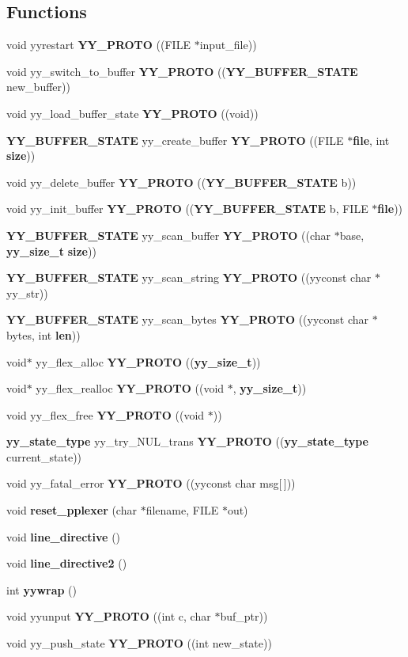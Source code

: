 \subsection*{Functions}
\begin{CompactItemize}
\item 
void yyrestart {\bf YY\_\-PROTO} ((FILE $\ast$input\_\-file))
\item 
void yy\_\-switch\_\-to\_\-buffer {\bf YY\_\-PROTO} (({\bf YY\_\-BUFFER\_\-STATE} new\_\-buffer))
\item 
void yy\_\-load\_\-buffer\_\-state {\bf YY\_\-PROTO} ((void))
\item 
{\bf YY\_\-BUFFER\_\-STATE} yy\_\-create\_\-buffer {\bf YY\_\-PROTO} ((FILE $\ast${\bf file}, int {\bf size}))
\item 
void yy\_\-delete\_\-buffer {\bf YY\_\-PROTO} (({\bf YY\_\-BUFFER\_\-STATE} b))
\item 
void yy\_\-init\_\-buffer {\bf YY\_\-PROTO} (({\bf YY\_\-BUFFER\_\-STATE} b, FILE $\ast${\bf file}))
\item 
{\bf YY\_\-BUFFER\_\-STATE} yy\_\-scan\_\-buffer {\bf YY\_\-PROTO} ((char $\ast$base, {\bf yy\_\-size\_\-t} {\bf size}))
\item 
{\bf YY\_\-BUFFER\_\-STATE} yy\_\-scan\_\-string {\bf YY\_\-PROTO} ((yyconst char $\ast$yy\_\-str))
\item 
{\bf YY\_\-BUFFER\_\-STATE} yy\_\-scan\_\-bytes {\bf YY\_\-PROTO} ((yyconst char $\ast$bytes, int {\bf len}))
\item 
void$\ast$ yy\_\-flex\_\-alloc {\bf YY\_\-PROTO} (({\bf yy\_\-size\_\-t}))
\item 
void$\ast$ yy\_\-flex\_\-realloc {\bf YY\_\-PROTO} ((void $\ast$, {\bf yy\_\-size\_\-t}))
\item 
void yy\_\-flex\_\-free {\bf YY\_\-PROTO} ((void $\ast$))
\item 
{\bf yy\_\-state\_\-type} yy\_\-try\_\-NUL\_\-trans {\bf YY\_\-PROTO} (({\bf yy\_\-state\_\-type} current\_\-state))
\item 
void yy\_\-fatal\_\-error {\bf YY\_\-PROTO} ((yyconst char msg[$\,$]))
\item 
void {\bf reset\_\-pplexer} (char $\ast$filename, FILE $\ast$out)
\item 
void {\bf line\_\-directive} ()
\item 
void {\bf line\_\-directive2} ()
\item 
int {\bf yywrap} ()
\item 
void yyunput {\bf YY\_\-PROTO} ((int c, char $\ast$buf\_\-ptr))
\item 
void yy\_\-push\_\-state {\bf YY\_\-PROTO} ((int new\_\-state))
\end{CompactItemize}
